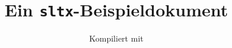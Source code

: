 \documentclass{sopra-paper}
\title{Ein \texttt{sltx}-Beispieldokument}
\subtitle{Kompiliert mit \thesopversion}
\begin{document}
    \Blinddocument
\end{document}

